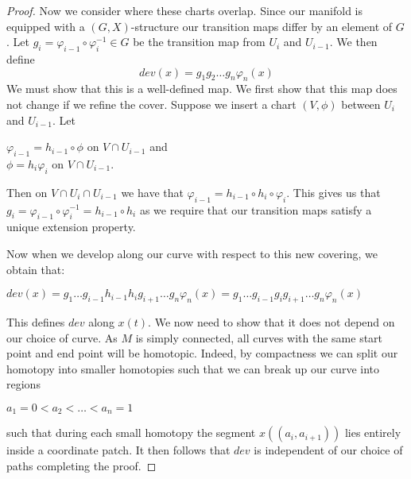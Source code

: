\begin{proof}
    Now we consider where these charts overlap. Since our manifold is equipped with
    a $(G,X)$-structure our transition maps differ by an element of $G$. Let $g_i =
        \varphi_{i-1}\circ\varphi^{-1}_i \in G$ be the transition map from $U_i$ and
    $U_{i-1}$. We then define $$ dev(x) = g_1g_2\dots g_n \varphi_n(x) $$ We must
    show that this is a well-defined map. We first show that this map does not
    change if we refine the cover. Suppose we insert a chart $(V, \phi)$ between
    $U_i$ and $U_{i-1}$. Let
    \begin{center}
        $\varphi_{i-1} = h_{i-1}\circ\phi$ on $V \cap U_{i-1}$ and \\
        $\phi = h_i\varphi_{i}$ on $V \cap U_{i-1}$.
    \end{center}
    Then on $V \cap U_i \cap U_{i-1}$ we have that $\varphi_{i-1} = h_{i-1}\circ h_i \circ \varphi_{i}$. This gives us that $g_i = \varphi_{i-1}\circ \varphi^{-1}_i = h_{i-1} \circ h_i$ as we require that our transition maps satisfy a unique extension property.

    Now when we develop along our curve with respect to this new covering, we
    obtain that:

    \begin{center}
        $dev(x) = g_1 \dots g_{i-1}h_{i-1}h_{i}g_{i+1}\dots g_n\varphi_n(x) = g_1 \dots g_{i-1}g_ig_{i+1}\dots g_n\varphi_n(x)$
    \end{center}

    This defines $dev$ along $x(t)$. We now need to show that it does not depend on
    our choice of curve. As $M$ is simply connected, all curves with the same start
    point and end point will be homotopic. Indeed, by compactness we can split our
    homotopy into smaller homotopies such that we can break up our curve into
    regions
    \begin{center}
        $a_1 =0 < a_2 < \dots < a_n=1$
    \end{center}
    such that during each small homotopy the segment $x((a_i, a_{i+1}))$ lies entirely inside a coordinate patch. It then follows that $dev$ is independent of our choice of paths completing the proof.

\end{proof}